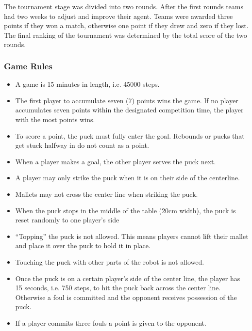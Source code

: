 The tournament stage was divided into two rounds. After the first rounds teams had two weeks to adjust and improve their agent.
Teams were awarded three points if they won a match, otherwise one point if they drew and zero if they lost.
The final ranking of the tournament was determined by the total score of the two rounds.

\subsubsection{Game Rules}
\begin{itemize}
    \item A game is 15 minutes in length, i.e. 45000 steps.
    \item The first player to accumulate seven (7) points wins the game. If no player accumulates seven points within the designated competition time, the player with the most points wins.
    \item To score a point, the puck must fully enter the goal. Rebounds or pucks that get stuck halfway in do not count as a point.
    \item When a player makes a goal, the other player serves the puck next.
    \item A player may only strike the puck when it is on their side of the centerline.
    \item Mallets may not cross the center line when striking the puck.
    \item When the puck stops in the middle of the table (20cm width), the puck is reset randomly to one player's side
    \item “Topping” the puck is not allowed. This means players cannot lift their mallet and place it over the puck to hold it in place.
    \item Touching the puck with other parts of the robot is not allowed.
    \item Once the puck is on a certain player's side of the center line, the player has 15 seconds, i.e. 750 steps, to hit the puck back across the center line. 
    Otherwise a foul is committed and the opponent receives possession of the puck.
    \item If a player commits three fouls a point is given to the opponent.
\end{itemize}
